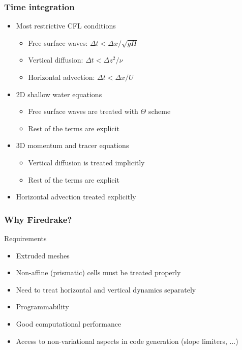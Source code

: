 \documentclass{beamer}
\begin{document}
\begin{frame}
\frametitle{Time integration}
\begin{itemize}
 \item Most restrictive CFL conditions
 \begin{itemize}
  \item Free surface waves: {\scriptsize $\Delta t < \Delta x / \sqrt{gH}$}
  \item Vertical diffusion: {\scriptsize $\Delta t < \Delta z^2 / \nu$}
  \item Horizontal advection: {\scriptsize $\Delta t < \Delta x / U$}
 \end{itemize}
 \item<2-> 2D shallow water equations
 \begin{itemize}
  \item Free surface waves are treated with $\Theta$ scheme
  \item Rest of the terms are explicit
 \end{itemize}
 \item<3-> 3D momentum and tracer equations
 \begin{itemize}
  \item Vertical diffusion is treated implicitly
  \item Rest of the terms are explicit
 \end{itemize}
\item<4-> Horizontal advection treated explicitly
\end{itemize}
\end{frame}

\begin{frame}
  \frametitle{Why Firedrake?}
  \begin{block}{Requirements}
    \begin{itemize}
    \item[\checkmark] Extruded meshes
    \item[\checkmark] Non-affine (prismatic) cells must be treated properly
    \item[\checkmark] Need to treat horizontal and vertical dynamics separately
    \item[\checkmark] Programmability
    \item[\checkmark] Good computational performance
    \item[\checkmark] Access to non-variational aspects in code generation (slope
      limiters, ...)
    \end{itemize}
  \end{block}
\end{frame}
\end{document}
